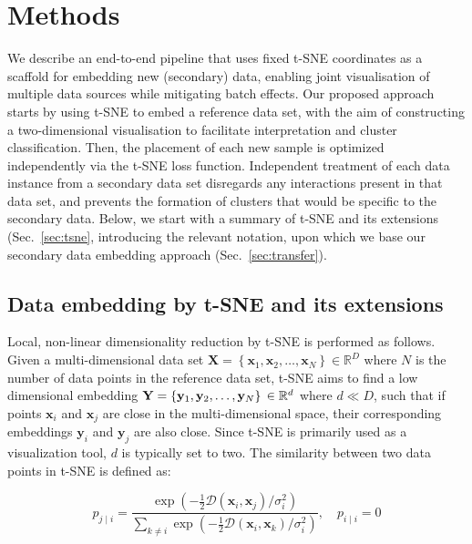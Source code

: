 \documentclass[runningheads]{llncs}
\begin{document}
\section{Methods}

We describe an end-to-end pipeline that uses fixed t-SNE coordinates as a
scaffold for embedding new (secondary) data, enabling joint visualisation of
multiple data sources while mitigating batch effects. Our proposed approach
starts by using t\nobreakdash -SNE to embed a reference data set, with the aim
of constructing a two-dimensional visualisation to facilitate interpretation
and cluster classification. Then, the placement of each new sample is optimized
independently via the t\nobreakdash -SNE loss function. Independent treatment
of each data instance from a secondary data set disregards any interactions
present in that data set, and prevents the formation of clusters that would be
specific to the secondary data. Below, we start with a summary of t-SNE and its
extensions (Sec.~\ref{sec:tsne}, introducing the relevant notation, upon which
we base our secondary data embedding approach (Sec.~\ref{sec:transfer}).


\subsection{Data embedding by t-SNE and its extensions\label{sec:tsne}}

Local, non-linear dimensionality reduction by t-SNE is performed as follows.
Given a multi-dimensional data set $\mathbf{X} = \left \{ \mathbf{x}_1,
\mathbf{x}_2, \dots, \mathbf{x}_N \right \} \in \mathbb{R}^D$ where $N$ is the
number of data points in the reference data set, t-SNE aims to find a low
dimensional embedding $\mathbf{Y} = \left \{ \mathbf{y}_1, \mathbf{y}_2, \dots,
\mathbf{y}_N \right \} \\\in \mathbb{R}^d$ where $d \ll D$, such that if points
$\mathbf{x}_i$ and $\mathbf{x}_j$ are close in the multi-dimensional space,
their corresponding embeddings $\mathbf{y}_i$ and $\mathbf{y}_j$ are also
close. Since t-SNE is primarily used as a visualization tool, $d$ is typically
set to two. The similarity between two data points in t-SNE is defined as:

\begin{equation}
p_{j \mid i} = \frac{\exp \left ( -\frac{1}{2} \mathcal{D}(\mathbf{x}_i, \mathbf{x}_j ) / \sigma_i^2 \right )}
{\sum_{k \neq i } \exp \left ( -\frac{1}{2} \mathcal{D}(\mathbf{x}_i, \mathbf{x}_k ) / \sigma_i^2 \right )}, \quad p_{i \mid i} = 0
\label{eq:gaussian_kernel}
\end{equation}
\end{document}
